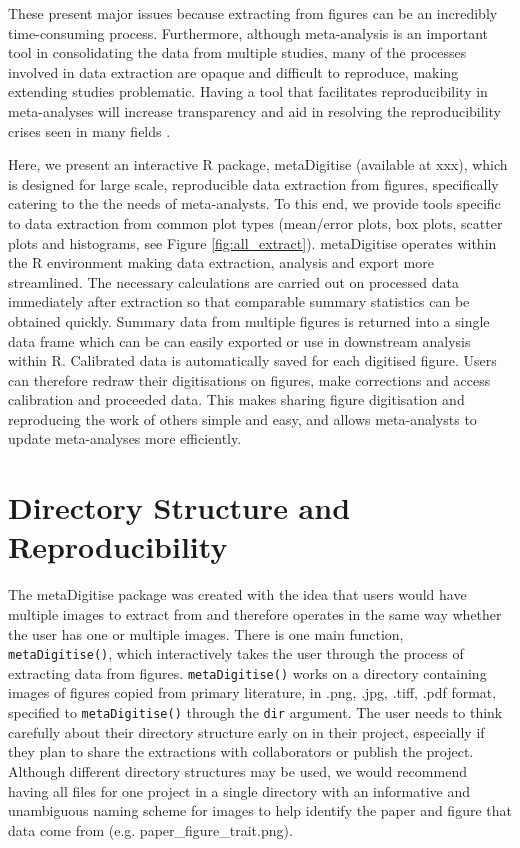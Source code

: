 \documentclass[12pt]{article}
\newcommand{\code}[1]{\texttt{#1}}
\newcommand{\fct}[1]{\texttt{#1()}}
\newcommand{\pkg}[1]{{\fontseries{b}\selectfont #1}}
\let\proglang=\textsf
\begin{document}
These present major issues because extracting from figures can be an incredibly time-consuming process. Furthermore, although meta-analysis is an important tool in consolidating the data from multiple studies, many of the processes involved in data extraction are opaque and difficult to reproduce, making extending studies problematic. Having a tool that facilitates reproducibility in meta-analyses will increase transparency and aid in resolving the reproducibility crises seen in many fields \citep{peng_reproducible_2006, peng_reproducible_2011, sandve_ten_2013, Parker2016,Ihle2017}.


Here, we present an interactive \proglang{R} package, \pkg{metaDigitise} (available at xxx), which is designed for large scale, reproducible data extraction from figures, specifically catering to the the needs of meta-analysts. To this end, we provide tools specific to data extraction from common plot types (mean/error plots, box plots, scatter plots and histograms, see Figure \ref{fig:all_extract}). \pkg{metaDigitise} operates within the \proglang{R} environment making data extraction, analysis and export more streamlined. The necessary calculations are carried out on processed data immediately after extraction so that comparable summary statistics can be obtained quickly. Summary data from multiple figures is returned into a single data frame which can be can easily exported or use in downstream analysis within \proglang{R}. Calibrated data is automatically saved for each digitised figure. Users can therefore redraw their digitisations on figures, make corrections and access calibration and proceeded data. This makes sharing figure digitisation and reproducing the work of others simple and easy, and allows meta-analysts to update meta-analyses more efficiently.




\section{Directory Structure and Reproducibility}
The \pkg{metaDigitise} package was created with the idea that users would have multiple images to extract from and therefore operates in the same way whether the user has one or multiple images. There is one main function, \fct{metaDigitise}, which interactively takes the user through the process of extracting data from figures. \fct{metaDigitise} works on a directory containing images of figures copied from primary literature, in .png, .jpg, .tiff, .pdf format, specified to \fct{metaDigitise} through the \code{dir} argument. The user needs to think carefully about their directory structure early on in their project, especially if they plan to share the extractions with collaborators or publish the project. Although different directory structures may be used, we would recommend having all files for one project in a single directory with an informative and unambiguous naming scheme for images to help identify the paper and figure that data come from (e.g. paper_figure_trait.png).
\end{document}
